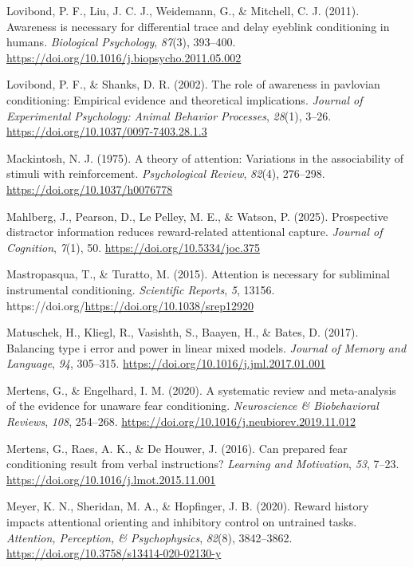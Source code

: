 \documentclass[
  man,
  floatsintext,
  longtable,
  nolmodern,
  notxfonts,
  notimes,
  mask,
  colorlinks=true,linkcolor=blue,citecolor=blue,urlcolor=blue]{apa7}
\newlength{\cslhangindent}
\newenvironment{CSLReferences}[2] %
 {\begin{list}{}{%
  \setlength{\itemindent}{0pt}
  \setlength{\leftmargin}{0pt}
  \setlength{\parsep}{0pt}
  \ifodd #1
   \setlength{\leftmargin}{\cslhangindent}
   \setlength{\itemindent}{-1\cslhangindent}
  \fi
  \setlength{\itemsep}{#2\baselineskip}}}
 {\end{list}}
\begin{document}
\begin{CSLReferences}{1}{0}
Lovibond, P. F., Liu, J. C. J., Weidemann, G., \& Mitchell, C. J.
(2011). Awareness is necessary for differential trace and delay eyeblink
conditioning in humans. \emph{Biological Psychology}, \emph{87}(3),
393--400. \url{https://doi.org/10.1016/j.biopsycho.2011.05.002}

Lovibond, P. F., \& Shanks, D. R. (2002). The role of awareness in
pavlovian conditioning: Empirical evidence and theoretical implications.
\emph{Journal of Experimental Psychology: Animal Behavior Processes},
\emph{28}(1), 3--26. \url{https://doi.org/10.1037/0097-7403.28.1.3}

Mackintosh, N. J. (1975). A theory of attention: Variations in the
associability of stimuli with reinforcement. \emph{Psychological
Review}, \emph{82}(4), 276--298. \url{https://doi.org/10.1037/h0076778}

Mahlberg, J., Pearson, D., Le Pelley, M. E., \& Watson, P. (2025).
Prospective distractor information reduces reward-related attentional
capture. \emph{Journal of Cognition}, \emph{7}(1), 50.
\url{https://doi.org/10.5334/joc.375}

Mastropasqua, T., \& Turatto, M. (2015). Attention is necessary for
subliminal instrumental conditioning. \emph{Scientific Reports},
\emph{5}, 13156. https://doi.org/\url{https://doi.org/10.1038/srep12920}

Matuschek, H., Kliegl, R., Vasishth, S., Baayen, H., \& Bates, D.
(2017). Balancing type i error and power in linear mixed models.
\emph{Journal of Memory and Language}, \emph{94}, 305--315.
\url{https://doi.org/10.1016/j.jml.2017.01.001}

Mertens, G., \& Engelhard, I. M. (2020). A systematic review and
meta-analysis of the evidence for unaware fear conditioning.
\emph{Neuroscience \& Biobehavioral Reviews}, \emph{108}, 254--268.
\url{https://doi.org/10.1016/j.neubiorev.2019.11.012}

Mertens, G., Raes, A. K., \& De Houwer, J. (2016). Can prepared fear
conditioning result from verbal instructions? \emph{Learning and
Motivation}, \emph{53}, 7--23.
\url{https://doi.org/10.1016/j.lmot.2015.11.001}

Meyer, K. N., Sheridan, M. A., \& Hopfinger, J. B. (2020). Reward
history impacts attentional orienting and inhibitory control on
untrained tasks. \emph{Attention, Perception, \& Psychophysics},
\emph{82}(8), 3842--3862.
\url{https://doi.org/10.3758/s13414-020-02130-y}


\end{CSLReferences}
\end{document}
